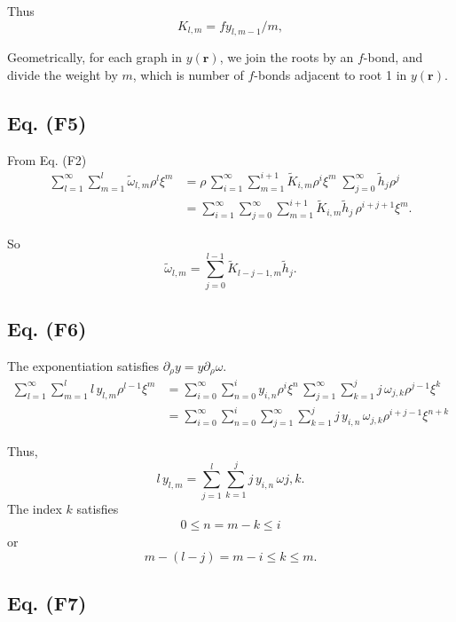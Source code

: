 \documentclass[preprint]{revtex4-1}
\numberwithin{equation}{subsection}
\numberwithin{table}{section}
\newcommand{\vct}[1]{\mathbf{#1}}
\providecommand{\vr}{} %
\renewcommand{\vr}{\vct{r}}
\begin{document}
Thus
\[
  K_{l,m} = f y_{l, m-1}/m,
\]


Geometrically, for each graph in $y(\vr)$,
we join the roots by an $f$-bond,
and divide the weight by $m$,
which is number of $f$-bonds adjacent to root 1
in $y(\vr)$.



\subsection{Eq. (F5)}

From Eq. (F2)
\begin{align*}
  \sum_{l=1}^\infty
  \sum_{m=1}^{l}
  \tilde\omega_{l,m} \rho^l \xi^m
&=
  \rho
  \,
  \sum_{i=1}^\infty
  \sum_{m=1}^{i+1}
  \tilde K_{i,m} \rho^i \xi^m
 \;
  \sum_{j=0}^\infty
  \tilde h_{j} \rho^j
\\
&=
  \sum_{i=1}^\infty
  \sum_{j=0}^\infty
  \sum_{m=1}^{i+1}
  \tilde K_{i,m}
  \tilde h_j
  \, \rho^{i+j+1} \xi^m.
\end{align*}

So
\[
  \tilde \omega_{l,m}
=
  \sum_{j = 0}^{l-1}
  \tilde K_{l - j - 1, m}
  \tilde h_{j}.
\]



\subsection{Eq. (F6)}

The exponentiation satisfies $\partial_\rho y = y \partial_\rho \omega$.
\begin{align*}
\sum_{l = 1}^\infty
\sum_{m = 1}^l
l \, y_{l, m} \rho^{l-1} \xi^m
&=
\sum_{i = 0}^\infty
\sum_{n = 0}^i
y_{i, n} \rho^{i} \xi^n
\,
\sum_{j = 1}^\infty
\sum_{k = 1}^j
j \, \omega_{j, k} \rho^{j-1} \xi^k
\\
&=
\sum_{i = 0}^\infty
\sum_{n = 0}^i
\sum_{j = 1}^\infty
\sum_{k = 1}^j
j \, y_{i, n} \,
\omega_{j, k} \rho^{i+j-1} \xi^{n+k}
\end{align*}

Thus,
\[
  l \, y_{l,m}
=
\sum_{j = 1}^{l} \sum_{k = 1}^j
j \, y_{i, n} \, \omega{j, k}.
\]
The index $k$ satisfies
\begin{align*}
   0 \le n = m - k \le i
\end{align*}
or
\[
  m - (l - j) = m - i \le k \le m.
\]


\subsection{Eq. (F7)}
\end{document}
